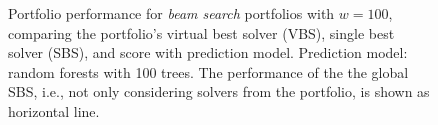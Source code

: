 \documentclass[conference]{IEEEtran}
\begin{document}
\begin{figure}[t]
	\centering
	\hfil
	\caption{
		Portfolio performance for \emph{beam search} portfolios with $w=100$, comparing the portfolio's virtual best solver (VBS), single best solver (SBS), and score with prediction model.
		Prediction model: random forests with 100 trees.
		The performance of the the global SBS, i.e., not only considering solvers from the portfolio, is shown as horizontal line.
	}
	\label{fig:prediction-test-objective-beam}
\end{figure}
\end{document}
